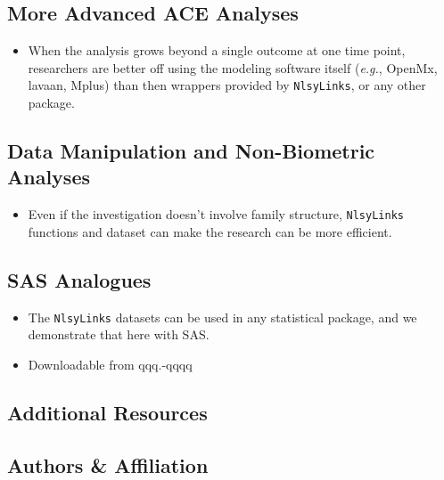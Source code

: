 \documentclass[smallextended]{svjour3}       %
\providecommand{\tightlist}{%
  \setlength{\itemsep}{0pt}\setlength{\parskip}{0pt}}
\begin{document}
\hypertarget{more-advanced-ace-analyses}{%
\subsection{More Advanced ACE
Analyses}\label{more-advanced-ace-analyses}}

\begin{itemize}
\tightlist
\item
  When the analysis grows beyond a single outcome at one time point,
  researchers are better off using the modeling software itself
  (\emph{e.g.}, OpenMx, lavaan, Mplus) than then wrappers provided by
  \texttt{NlsyLinks}, or any other package.
\end{itemize}

\hypertarget{data-manipulation-and-non-biometric-analyses}{%
\subsection{Data Manipulation and Non-Biometric
Analyses}\label{data-manipulation-and-non-biometric-analyses}}

\begin{itemize}
\tightlist
\item
  Even if the investigation doesn't involve family structure,
  \texttt{NlsyLinks} functions and dataset can make the research can be
  more efficient.
\end{itemize}

\hypertarget{sas-analogues}{%
\subsection{SAS Analogues}\label{sas-analogues}}

\begin{itemize}
\tightlist
\item
  The \texttt{NlsyLinks} datasets can be used in any statistical
  package, and we demonstrate that here with SAS.
\item
  Downloadable from qqq.-qqqq
\end{itemize}

\hypertarget{additional-resources}{%
\subsection{Additional Resources}\label{additional-resources}}

\hypertarget{authors-affiliation}{%
\subsection{Authors \& Affiliation}\label{authors-affiliation}}
\end{document}
